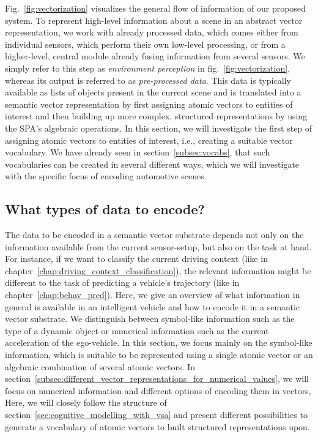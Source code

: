 Fig.~\ref{fig:vectorization} visualizes the general flow of information of our proposed system.
To represent high-level information about a scene in an abstract vector representation, we work with already processed data, which comes either from individual sensors, which perform their own low-level processing, or from a higher-level, central module already fusing information from several sensors.
We simply refer to this step as \emph{environment perception} in fig.~\ref{fig:vectorization}, whereas its output is referred to as \emph{pre-processed data}.
This data is typically available as lists of objects present in the current scene and is translated into a semantic vector representation by first assigning atomic vectors to entities of interest and then building up more complex, structured representations by using the \ac{SPA}'s algebraic operations.
In this section, we will investigate the first step of assigning atomic vectors to entities of interest, i.e., creating a suitable vector vocabulary.
We have already seen in section~\ref{subsec:vocabs}, that such vocabularies can be created in several different ways, which we will investigate with the specific focus of encoding automotive scenes.

\subsection{What types of data to encode?}%
\label{subsec:what_types_of_data_to_encode_}

The data to be encoded in a semantic vector substrate depends not only on the information available from the current sensor-setup, but also on the task at hand.
For instance, if we want to classify the current driving context (like in chapter~\ref{chap:driving_context_classification}), the relevant information might be different to the task of predicting a vehicle's trajectory (like in chapter~\ref{chap:behav_pred}).
Here, we give an overview of what information in general is available in an intelligent vehicle and how to encode it in a semantic vector substrate.
We distinguish between symbol-like information such as the type of a dynamic object or numerical information such as the current acceleration of the ego-vehicle.
In this section, we focus mainly on the symbol-like information, which is suitable to be represented using a single atomic vector or an algebraic combination of several atomic vectors.
In section~\ref{subsec:different_vector_representations_for_numerical_values}, we will focus on numerical information and different options of encoding them in vectors,
Here, we will closely follow the structure of section~\ref{sec:cognitive_modelling_with_vsa} and present different possibilities to generate a vocabulary of atomic vectors to built structured representations upon.

